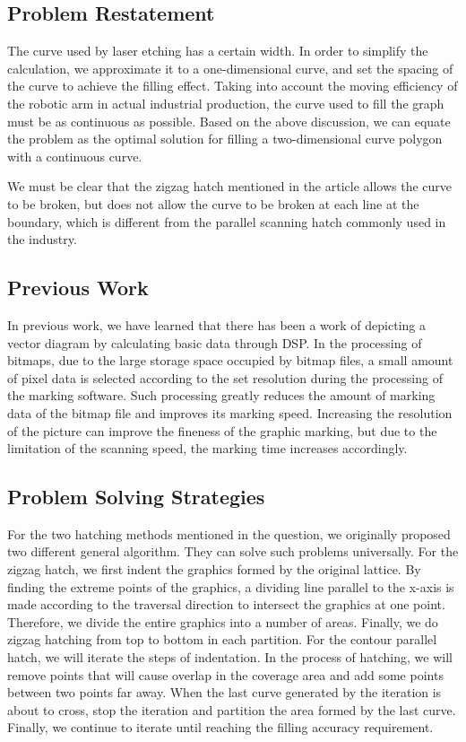\documentclass{apmcmthesis}
\begin{document}
\subsection{Problem Restatement}
The curve used by laser etching has a certain width. In order to simplify the calculation, we approximate it to a one-dimensional curve, and set the spacing of the curve to achieve the filling effect. Taking into account the moving efficiency of the robotic arm in actual industrial production, the curve used to fill the graph must be as continuous as possible. Based on the above discussion, we can equate the problem as the optimal solution for filling a two-dimensional curve polygon with a continuous curve.


We must be clear that the zigzag hatch mentioned in the article allows the curve to be broken, but does not allow the curve to be broken at each line at the boundary, which is different from the parallel scanning hatch commonly used in the industry.


\subsection{Previous Work}
In previous work, we have learned that there has been a work of depicting a vector diagram by calculating basic data through DSP. In the processing of bitmaps, due to the large storage space occupied by bitmap files, a small amount of pixel data is selected according to the set resolution during the processing of the marking software. Such processing greatly reduces the amount of marking data of the bitmap file and improves its marking speed. Increasing the resolution of the picture can improve the fineness of the graphic marking, but due to the limitation of the scanning speed, the marking time increases accordingly.


\subsection{Problem Solving Strategies}
For the two hatching methods mentioned in the question, we originally proposed two different general algorithm. They can solve such problems universally.
For the zigzag hatch, we first indent the graphics formed by the original lattice. By finding the extreme points of the graphics, a dividing line parallel to the x-axis is made according to the traversal direction to intersect the graphics at one point. Therefore, we divide the entire graphics into a number of areas. Finally, we do zigzag hatching from top to bottom in each partition.
For the contour parallel hatch, we will iterate the steps of indentation. In the process of hatching, we will remove points that will cause overlap in the coverage area and add some points between two points far away. When the last curve generated by the iteration is about to cross, stop the iteration and partition the area formed by the last curve. Finally, we continue to iterate until reaching the filling accuracy requirement.
\end{document}
